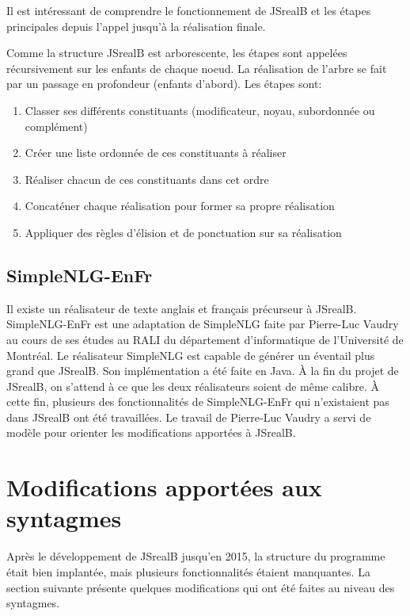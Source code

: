\documentclass[11pt]{article} %
\newcommand{\system}[1]{\textsf{#1}}
\newcommand{\JSB}{\system{JSrealB}}
\begin{document}
Il est intéressant de comprendre le fonctionnement de \JSB{} et
 les étapes principales depuis l'appel jusqu'à la réalisation finale.

Comme la structure \JSB{} est arborescente, les
étapes sont appelées récursivement sur les
enfants de chaque noeud. La réalisation de l'arbre se fait par un
passage en profondeur (enfants d'abord). Les étapes sont:
\begin{enumerate}
\item Classer ses différents constituants (modificateur, noyau, subordonnée
ou complément)
\item Créer une liste ordonnée de ces constituants à réaliser
\item Réaliser chacun de ces constituants dans cet ordre 
\item Concaténer chaque réalisation pour former sa propre réalisation
\item Appliquer des règles d'élision et de ponctuation sur sa réalisation
\end{enumerate}

\subsection{\system{SimpleNLG-EnFr}}

Il existe un réalisateur de texte anglais et français précurseur à
\JSB{}. \system{SimpleNLG-EnFr} est une adaptation de \system{SimpleNLG} faite par Pierre-Luc
Vaudry au cours de ses études au RALI du département d'informatique
de l'Université de Montréal\cite{simpleNLGVaudry}. Le réalisateur \system{SimpleNLG} est capable
de générer un éventail plus grand que \JSB{}. Son implémentation
a été faite en Java. À la fin du projet de \JSB{}, on s'attend à ce que
les deux réalisateurs soient de même calibre. À cette fin, plusieurs
des fonctionnalités de \system{SimpleNLG-EnFr} qui n'existaient pas dans \JSB{}
ont été travaillées. Le travail de Pierre-Luc Vaudry a servi de modèle
pour orienter les modifications apportées à \JSB{}.

\section{Modifications apportées aux syntagmes}
Après le développement de \JSB{} jusqu'en 2015, la structure du programme
était bien implantée, mais plusieurs fonctionnalités étaient manquantes.
La section suivante présente quelques modifications qui
ont été faites au niveau des syntagmes.
\end{document}
